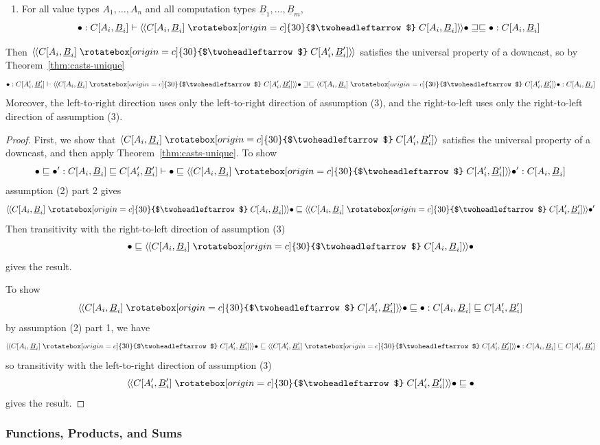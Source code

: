 \documentclass[acmsmall,nonacm]{acmart}
\renewcommand{\u}{\underline}
\newcommand{\ltdyn}{\sqsubseteq}
\newcommand{\gtdyn}{\sqsupseteq}
\newcommand{\equidyn}{\mathrel{\gtdyn\ltdyn}}
\newcommand{\darrow}{\mathrel{\rotatebox[origin=c]{30}{$\twoheadleftarrow$}}}
\newcommand{\dncast}[2]{\langle{#1}\darrow{#2}\rangle}
\newcommand{\defdncast}[2]{\langle\kern-1ex~\langle{#1}\darrow{#2}\rangle\kern-1ex~\rangle}
\begin{document}
\begin{longonly}
\begin{lemma}
\begin{enumerate}
  \item For all value types $A_1,\ldots,A_n$ and all computation types
    $\u B_1,\ldots,\u B_m$,
    \[
    \bullet : C[A_i,\u B_i] \vdash \defdncast{C[A_i,\u B_i]}{C[A_i,\u B_i]}{\bullet} \equidyn \bullet : C[A_i,\u B_i]
    \]
  \end{enumerate}
  Then $\defdncast{C[A_i,\u B_i]}{C[A_i',\u B_i']}$ satisfies the
  universal property of a downcast, so by Theorem~\ref{thm:casts-unique}
  \[
  \bullet : C[A_i',\u B_i'] \vdash \defdncast{C[A_i,\u B_i]}{C[A_i',\u B_i']}{\bullet} \equidyn \dncast{C[A_i,\u B_i]}{C[A_i',\u B_i']}{\bullet} : C[A_i,\u B_i]
  \]
  Moreover, the left-to-right direction uses only the left-to-right
  direction of assumption (3), and the right-to-left uses only the
  right-to-left direction of assumption (3).
\end{lemma}

\begin{proof}

  First, we show that $\dncast{C[A_i,\u B_i]}{C[A_i',\u B_i']}$
  satisfies the universal property of a downcast, and then apply
  Theorem~\ref{thm:casts-unique}.
  To show
  \[
  \bullet \ltdyn \bullet' : C[A_i,\u B_i] \ltdyn C[A_i',\u B_i'] \vdash \bullet \ltdyn \defdncast{C[A_i,\u B_i]}{C[A_i',\u B_i']}{\bullet'} : C[A_i,\u B_i] 
  \]
  assumption (2) part 2 gives
  \[
  \defdncast{C[A_i,\u B_i]}{C[A_i,\u B_i]}{\bullet} \ltdyn \defdncast{C[A_i,\u B_i]}{C[A_i',\u B_i']}{\bullet'} 
  \]
  Then transitivity with the right-to-left direction of assumption (3)
  \[
    \bullet
    \ltdyn
    \defdncast{C[A_i,\u B_i]}{C[A_i,\u B_i]}{\bullet}
  \]
  gives the result.

  To show 
  \[
    \defdncast{C[A_i,\u B_i]}{C[A_i',\u B_i']}{\bullet} \ltdyn \bullet : {C[A_i,\u B_i]} \ltdyn {C[A_i',\u B_i']} 
    \]
    by assumption (2) part 1, we have 
    \[
    \defdncast{C[A_i,\u B_i]}{C[A_i',\u B_i']}{\bullet} \ltdyn \defdncast{C[A_i',\u B_i']}{C[A_i',\u B_i']}{\bullet} : C[A_i,\u B_i] \ltdyn C[A_i',\u B_i']
    \]
    so transitivity with the left-to-right direction of assumption (3)
    \[
    \defdncast{C[A_i',\u B_i']}{C[A_i',\u B_i']}{\bullet} \ltdyn \bullet
    \]
    gives the result.
\end{proof}
\end{longonly}

\begin{longonly}
\subsubsection{Functions, Products, and Sums}
\end{longonly}
\end{document}
